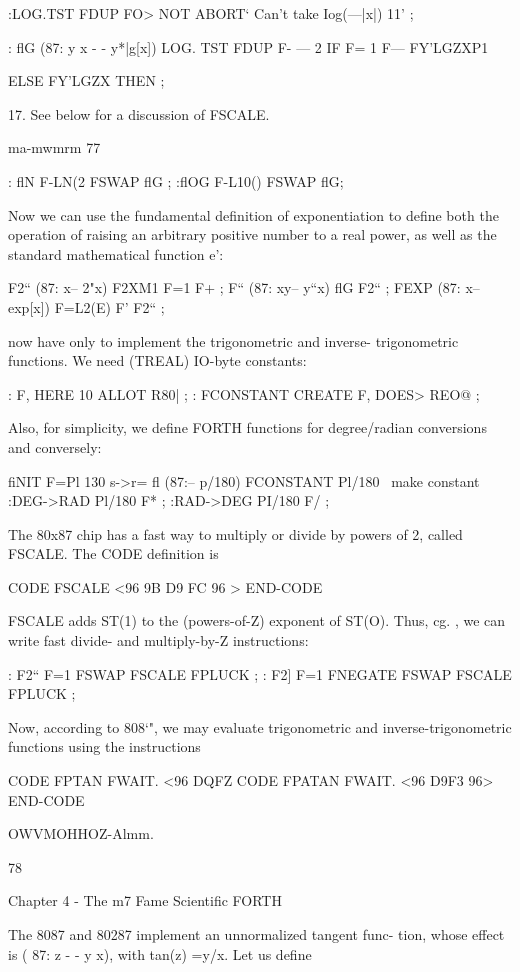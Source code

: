 {{{{:LOG.TST FDUP FO> NOT
ABORT‘ Can't take Iog(—|x|) 11' ;

: flG (87: y x - - y*|g[x])
LOG. TST FDUP F- — 2
IF F= 1 F— FY'LGZXP1

ELSE FY'LGZX THEN ;

 

17. See below for a discussion of FSCALE.

ma-mwmrm 77

: flN F-LN(2 FSWAP flG ;
:flOG F-L10() FSWAP flG;

Now we can use the fundamental definition of exponentiation to define both the operation of raising an arbitrary positive number to a real power, as well as the standard mathematical function e’:

F2“ (87: x-- 2"x) F2XM1 F=1 F+ ;
F“ (87: xy-- y“x) flG F2“ ;
FEXP (87: x-- exp[x]) F=L2(E) F' F2“ ;

 now have only to implement the trigonometric and inverse-
trigonometric functions. We need (TREAL) IO-byte constants:

: F, HERE 10 ALLOT R80| ;
: FCONSTANT CREATE F, DOES> REO@ ;

Also, for simplicity, we define FORTH functions for degree/radian conversions and conversely:

fiNIT F=Pl 130 s->r= fl (87:-- p/180)
FCONSTANT Pl/180 \ make constant
:DEG->RAD Pl/180 F* ;
:RAD->DEG PI/180 F/ ;

The 80x87 chip has a fast way to multiply or divide by powers of
2, called FSCALE. The CODE definition is

CODE FSCALE <96 9B D9 FC 96 > END-CODE

FSCALE adds ST(1) to the (powers-of-Z) exponent of ST(O).
Thus, cg. , we can write fast divide- and multiply-by-Z instructions:

: F2“ F=1 FSWAP FSCALE FPLUCK ;
: F2] F=1 FNEGATE FSWAP FSCALE FPLUCK ;

Now, according to 808‘", we may evaluate trigonometric and
inverse-trigonometric functions using the instructions

CODE FPTAN FWAIT. <96 DQFZ %
CODE FPATAN FWAIT. <96 D9F3 96> END-CODE

OWVMOHHOZ-Almm.

78

Chapter 4 - The m7 Fame Scientific FORTH

The 8087 and 80287 implement an unnormalized tangent func-
tion, whose effect is ( 87: z - - y x), with tan(z) =y/x. Let us define

}}}}
